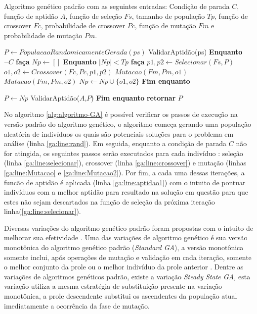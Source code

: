 \documentclass[
	12pt,				%
	oneside,			%
	a4paper,			%
	english,			%
	brazil				%
	]{abntex2ppgsi}
\begin{document}
\begin{algorithm}[htbp]
\caption{Algoritmo genético padrão com as seguintes entradas: Condição de parada $C$, função de aptidão $A$, função de seleção $Fs$, tamanho de população $Tp$, função de crossover $Fc$, probabilidade de crossover $Pc$, função de mutação $Fm$ e probabilidade de mutação $Pm$.}
\label{alg:algoritmo-genetico}


\begin{algorithmic}[1]

\State$ P \leftarrow  PopulacaoRandomicamenteGerada(ps)$ \label{ga:line:rand}
\State ValidarAptidão(ps)
\State \textbf{Enquanto} $\neg C$ \textbf{faça}
\State \quad $ Np \leftarrow  []$
\State \quad \textbf{Enquanto} $ |Np| < Tp $ \textbf{faça}
\State \quad \quad  $ p1,p2 \leftarrow Selecionar(Fs, P) $ \label{ga:line:selecionar}
\State \quad \quad  $ o1,o2 \leftarrow Crossover(Fc, Pc, p1,p2) $ \label{ga:line:crossover}
\State \quad \quad  $ Mutacao(Fm, Pm, o1) $ \label{ga:line:Mutacao}
\State \quad \quad  $ Mutacao(Fm, Pm, o2) $ \label{ga:line:Mutacao2}
\State \quad \quad  $ Np \leftarrow  Np \cup \{o1,o2\}$
\State \quad \textbf{Fim enquanto}

\State  $ P\leftarrow  Np$
\State ValidarAptidão($A$,$P$) \label{ga:line:aptidao1}
\State \textbf{Fim enquanto}
\State \textbf{retornar} $P$

\end{algorithmic}
\label{alg:algoritmo-GA}
\end{algorithm}

No algoritmo \ref{alg:algoritmo-GA} é possível verificar os passos de execução na versão padrão do algoritmo genético, o algoritmo começa gerando uma população aleatória de indivíduos os quais são potenciais soluções para o problema em análise (linha \ref{ga:line:rand}). Em seguida, enquanto a condição de parada $C$ não for atingida, os seguintes passos serão executados para cada indivíduo : seleção (linha \ref{ga:line:selecionar}), crossover (linha \ref{ga:line:crossover}) e mutação (linhas \ref{ga:line:Mutacao} e \ref{ga:line:Mutacao2}). Por fim, a cada uma dessas iterações, a funcão de aptidão é aplicada (linha \ref{ga:line:aptidao1}) com o intuito de pontuar indivíduos com a melhor aptidão para resultado na solução em questão para que estes não sejam descartados na função de seleção da próxima iteração linha(\ref{ga:line:selecionar}). 

Diversas variações do algoritmo genético padrão foram propostas com o intuito de melhorar sua efetividade \cite{Campos2017}. Uma das variações de algoritmo genético é sua versão monotônica do algoritmo genético padrão (\textit{Standard GA}), a versão monotônica somente inclui, após operações de mutação e validação em cada iteração, somente o melhor conjunto da prole ou o melhor indivíduo da prole anterior \cite{Campos2017}.  Dentre as variações de algoritmos genéticos padrão, existe a variação \textit{Steady State GA,} esta variação utiliza a mesma estratégia de substituição presente na variação monotônica, a prole descendente substitui os ascendentes da população atual imediatamente a ocorrência da fase de mutação.  \cite{Campos2017}
\end{document}
